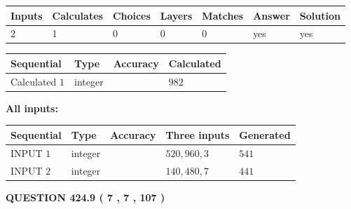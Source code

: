 \documentclass{ctexart}
\begin{document}
 
\noindent{}
 
 

 
   
   
   
   
\noindent\begin{tabular}{|l|l|l|l|l|l|l|}
 \hline
Inputs & Calculates & Choices & Layers & Matches & Answer & Solution \\ \hline
 2  & 
 1  & 
 0
  & 
 0  & 
 0  & 
  yes & 
  yes 
  \\ \hline
 \end{tabular}
   
   
   
   
\noindent{}
   
   
  
  
\noindent\begin{tabular}{|l|l|l|l|}
\hline
 Sequential & Type & Accuracy & Calculated \\ 
\hline
 
 
  Calculated $  1 $ & integer &  & 
  $ 982 $ 
 \\  \hline  
 \end{tabular}
   
   
   
   
\noindent\vspace{0.1in}\hspace{-0.08in} {\textbf{\Large{All inputs: }}}
   
   
  
  
\noindent\begin{tabular}{|l|l|l|l|l|}
\hline
 Sequential & Type & Accuracy & Three inputs & Generated \\ 
\hline
 
 
  INPUT $  1 $ & integer &  & $
 520
 , 
 960
 , 
 3
 $ & $ 541 $ 
 \\  \hline  
 
 
  INPUT $  2 $ & integer &  & $
 140
 , 
 480
 , 
 7
 $ & $ 441 $ 
 \\  \hline  
 \end{tabular}
   
   
  
\vspace{0.2in}
  
{\textbf{\Large{QUESTION
424.9 
 ( 7 , 7 , 107 )
}}}
  
  
 
\end{document}
